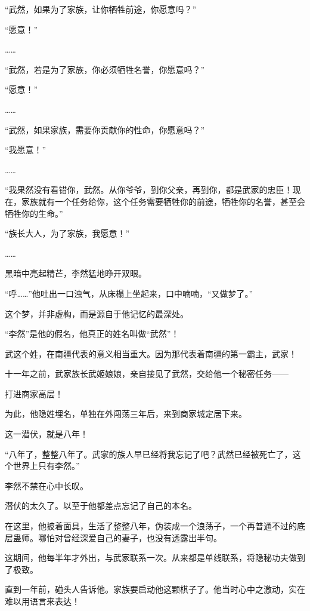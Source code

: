 
\begin{this_body}



“武然，如果为了家族，让你牺牲前途，你愿意吗？”

“愿意！”

……

“武然，若是为了家族，你必须牺牲名誉，你愿意吗？”

“愿意！”

……

“武然，如果家族，需要你贡献你的性命，你愿意吗？”

“我愿意！”

……

“我果然没有看错你，武然。从你爷爷，到你父亲，再到你，都是武家的忠臣！现在，家族就有一个任务给你，这个任务需要牺牲你的前途，牺牲你的名誉，甚至会牺牲你的生命。”

“族长大人，为了家族，我愿意！”

……

黑暗中亮起精芒，李然猛地睁开双眼。

“呼……”他吐出一口浊气，从床榻上坐起来，口中喃喃，“又做梦了。”

这个梦，并非虚构，而是源自于他记忆的最深处。

“李然”是他的假名，他真正的姓名叫做“武然”！

武这个姓，在南疆代表的意义相当重大。因为那代表着南疆的第一霸主，武家！

十一年之前，武家族长武姬娘娘，亲自接见了武然，交给他一个秘密任务——

打进商家高层！

为此，他隐姓埋名，单独在外闯荡三年后，来到商家城定居下来。

这一潜伏，就是八年！

“八年了，整整八年了。武家的族人早已经将我忘记了吧？武然已经被死亡了，这个世界上只有李然。”

李然不禁在心中长叹。

潜伏的太久了。以至于他都差点忘记了自己的本名。

在这里，他披着面具，生活了整整八年，伪装成一个浪荡子，一个再普通不过的底层蛊师。哪怕对曾经深爱自己的妻子，也没有透露出半句。

这期间，他每半年才外出，与武家联系一次。从来都是单线联系，将隐秘功夫做到了极致。

直到一年前，碰头人告诉他。家族要启动他这颗棋子了。他当时心中之激动，实在难以用语言来表达！


\end{this_body}
